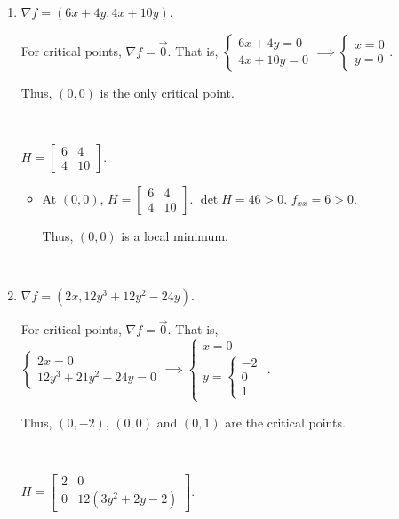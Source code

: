 \documentclass[11pt,fleqn]{book} %
\begin{document}
\begin{enumerate}
    \item $\nabla f = \left( 6x + 4y, 4x + 10y \right)$.
    
    For critical points, $\nabla f = \vec{0}$. That is, $\begin{cases} 6x + 4y = 0 \\ 4x + 10y = 0 \end{cases} \implies \begin{cases} x = 0 \\ y = 0 \end{cases}$. 

    Thus, $(0,0)$ is the only critical point. 

    {~~~}

    $H = \begin{bmatrix} 6 & 4 \\ 4 & 10 \end{bmatrix}$. 
    
    \begin{itemize}
        \item At $(0, 0)$, $H = \begin{bmatrix} 6 & 4 \\ 4 & 10 \end{bmatrix}$. $\det H = 46 > 0$. $f_{xx} = 6 > 0$. 

        Thus, $(0, 0)$ is a local minimum. 
    \end{itemize}
    
    {~~~}

    \item $\nabla f = \left( 2x, 12y^3 + 12y^2 - 24y \right)$.

    For critical points, $\nabla f = \vec{0}$. That is, $\begin{cases} 2x = 0 \\ 12y^3 + 21y^2 - 24y = 0 \end{cases} \implies \begin{cases} x = 0 \\ y = \begin{cases} -2 \\ 0 \\ 1 \end{cases} \end{cases}$. 
    
    Thus, $(0, -2)$, $(0, 0)$ and $(0, 1)$ are the critical points. 

    {~~~}

    $H = \begin{bmatrix} 2 & 0 \\ 0 & 12(3y^2 + 2y - 2) \end{bmatrix}$. 


\end{enumerate}
\end{document}
